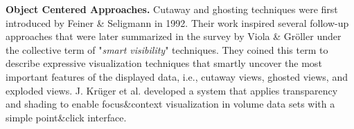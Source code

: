 \noindent
\textbf{Object Centered Approaches.}
Cutaway and ghosting techniques were first introduced by Feiner \& Seligmann \cite{feiner92} in 1992.
Their work inspired several follow-up approaches \cite{diep02, diep03, weiskopf03, viola2004importance, Viola05, Kruger05} that were later summarized in the survey by Viola \& Gr{\"o}ller \cite{violasmart05} under the collective term of "\textit{smart visibility}" techniques. They coined this term to describe expressive visualization techniques that smartly uncover the most important features of the displayed data, i.e., cutaway views, ghosted views, and exploded views. 
J. Kr{\"u}ger et al. \cite{kruger06} developed a system that applies transparency and shading to enable focus\&context visualization in volume data sets with a simple point\&click interface.


